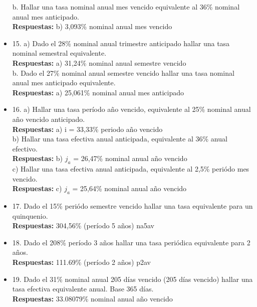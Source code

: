 \begin{itemize}
       b. Hallar una tasa nominal anual mes vencido equivalente al 36\% nominal anual mes anticipado.\\
       \textbf{Respuestas:} b) 3,093\% nominal anual mes vencido
       \medskip

 \item 15. a) Dado el 28\% nominal anual trimestre anticipado hallar una tasa nominal semestral equivalente.\\
       \textbf{Respuestas:} a) 31,24\% nominal anual semestre vencido \\

       b. Dado el 27\% nominal anual semestre vencido hallar una tasa nominal anual mes anticipado equivalente.\\
       \textbf{Respuestas:} a) 25,061\% nominal anual mes anticipado
       \medskip

 \item 16. a) Hallar una tasa período año vencido, equivalente al 25\% nominal anual año vencido anticipado.\\
       \textbf{Respuestas:} a) i = 33,33\% periodo año vencido\\

       b) Hallar una tasa efectiva anual anticipada, equivalente al 36\% anual efectivo. \\
       \textbf{Respuestas:} b) $j_{a}$ = 26,47\% nominal anual año vencido\\

       c) Hallar una tasa efectiva anual anticipada, equivalente al 2,5\% periódo mes vencido.\\
       \textbf{Respuestas:} c) $j_{a}$ = 25,64\% nominal anual año vencido
       \medskip

 \item 17. Dado el 15\% periódo semestre vencido hallar una tasa equivalente para un quinquenio.\\
       \textbf{Respuestas:} 304,56\% (período 5 años) na5av
       \medskip

 \item 18. Dado el 208\% período 3 años hallar una tasa periódica equivalente para 2 años.\\
       \textbf{Respuestas:} 111.69\% (período 2 años)  p2av
       \medskip

 \item 19. Dado el 31\% nominal anual 205 días vencido (205 días vencido) hallar una tasa efectiva equivalente anual. Base 365 días.\\
       \textbf{Respuestas:} 33.08079\% nominal anual año vencido
       \medskip


\end{itemize}
